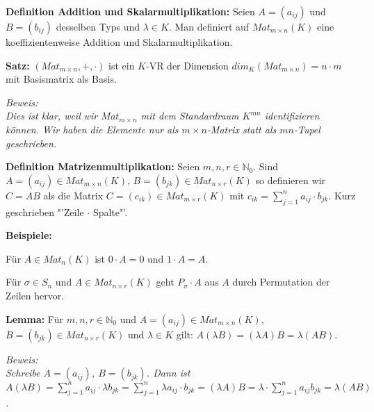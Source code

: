 \documentclass[11pt]{article}
\begin{document}
		\begin{mdframed}[backgroundcolor=blue!20]
			\textbf{Definition Addition und Skalarmultiplikation:} Seien $A=(a_{ij})$ und $B=(b_{ij})$ desselben Typs und 
			$\lambda \in K$. Man definiert auf $Mat_{m\times n}(K)$ eine koeffizientenweise Addition und Skalarmultiplikation.
		\end{mdframed}
		
		\begin{framed}
			\textbf{Satz:} $(Mat_{m\times n},+,\cdot)$ ist ein $K$-VR der Dimension $dim_K(Mat_{m\times n})=n\cdot m$ mit 
			Basismatrix als Basis.
		\end{framed}
		\textit{Beweis: \\
		Dies ist klar, weil wir $Mat_{m\times n}$ mit dem Standardraum $K^{mn}$ identifizieren können. Wir haben die 
		Elemente nur als $m\times n$-Matrix statt als $mn$-Tupel geschrieben.} \\
		
		\begin{mdframed}[backgroundcolor=blue!20]
			\textbf{Definition Matrizenmultiplikation:} Seien $m,n,r \in \mathbb N_0$. Sind $A=(a_{ij})\in Mat_{m\times n}(K)$, 
			$B=(b_{jk})\in Mat_{n\times r}(K)$ so definieren wir $C=AB$ als die Matrix $C=(c_{ik})\in Mat_{m\times r}(K)$ mit 
			$c_{ik}=\sum\limits_{j=1}^n a_{ij}\cdot b_{jk}$. Kurz geschrieben "'Zeile $\cdot$ Spalte"'.
		\end{mdframed}
		
		\textbf{Beispiele:}
		\begin{compactitem}
			\item Für $A\in Mat_n(K)$ ist $0\cdot A=0$ und $1\cdot A=A$.
			\item Für $\sigma \in S_n$ und $A\in Mat_{n\times r}(K)$ geht $P_{\sigma}\cdot A$ aus $A$ durch Permutation der 
			Zeilen hervor.
		\end{compactitem}
		
		\begin{framed}
			\textbf{Lemma:} Für $m,n,r \in \mathbb N_0$ und $A=(a_{ij})\in Mat_{m\times n}(K)$, $B=(b_{jk})\in Mat_
			{n\times r}(K)$ und $\lambda\in K$ gilt: $A(\lambda B)=(\lambda A)B=\lambda(AB)$.
		\end{framed}
		\textit{Beweis: \\
		Schreibe $A=(a_{ij})$, $B=(b_{jk})$. Dann ist $A(\lambda B)=\sum\limits_{j=1}^n a_{ij}\cdot \lambda b_{jk}=\sum
		\limits_{j=1}^n \lambda a_{ij} \cdot b_{jk}=(\lambda A)B=\lambda \cdot \sum\limits_{j=1}^n a_{ij}b_{jk}=\lambda
		(AB)$.} \\
		
\end{document}
